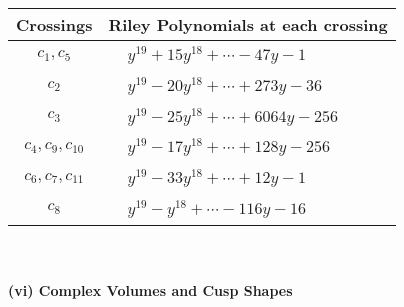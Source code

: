 \documentclass[1p]{elsarticle_modified}
\theoremstyle{definition}
\begin{document}
\begin{tabular}{m{50pt}|m{274pt}}
Crossings & \hspace{64pt}Riley Polynomials at each crossing \\
\hline $$\begin{aligned}c_{1},c_{5}\end{aligned}$$&$\begin{aligned}
&y^{19}+15 y^{18}+\cdots-47 y-1
\end{aligned}$\\
\hline $$\begin{aligned}c_{2}\end{aligned}$$&$\begin{aligned}
&y^{19}-20 y^{18}+\cdots+273 y-36
\end{aligned}$\\
\hline $$\begin{aligned}c_{3}\end{aligned}$$&$\begin{aligned}
&y^{19}-25 y^{18}+\cdots+6064 y-256
\end{aligned}$\\
\hline $$\begin{aligned}c_{4},c_{9},c_{10}\end{aligned}$$&$\begin{aligned}
&y^{19}-17 y^{18}+\cdots+128 y-256
\end{aligned}$\\
\hline $$\begin{aligned}c_{6},c_{7},c_{11}\end{aligned}$$&$\begin{aligned}
&y^{19}-33 y^{18}+\cdots+12 y-1
\end{aligned}$\\
\hline $$\begin{aligned}c_{8}\end{aligned}$$&$\begin{aligned}
&y^{19}- y^{18}+\cdots-116 y-16
\end{aligned}$\\
\hline
\end{tabular}\\~\\
\newpage\flushleft \textbf{(vi) Complex Volumes and Cusp Shapes}
\end{document}
